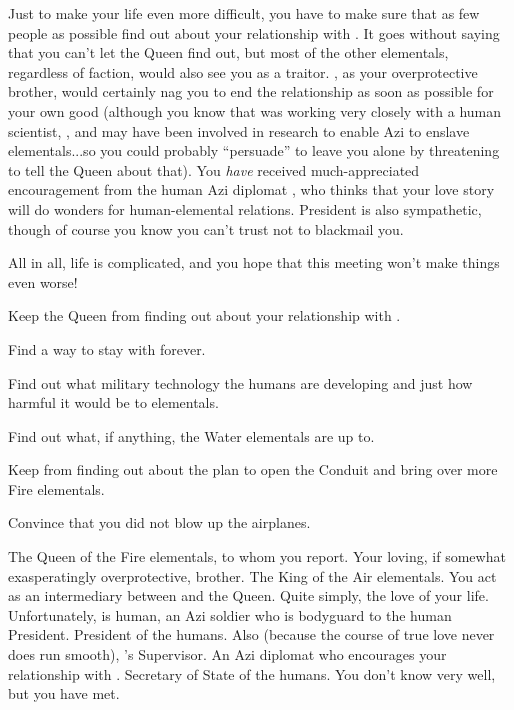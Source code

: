\documentclass[char]{elementals}
\begin{document}
Just to make your life even more difficult, you have to make sure that as few people as possible find out about your relationship with \cRomeo{}.  It goes without saying that you can't let the Queen find out, but most of the other elementals, regardless of faction, would also see you as a traitor.  \cPyro{}, as your overprotective brother, would certainly nag you to end the relationship as soon as possible for your own good (although you know that \cPyro{\they} was working very closely with a human scientist, \cMS{\intro}, and may have been involved in research to enable Azi to enslave elementals...so you could probably ``persuade'' \cPyro{\them} to leave you alone by threatening to tell the Queen about that).  You \emph{have} received much-appreciated encouragement from the human Azi diplomat \cDiplomat{\intro}, who thinks that your love story will do wonders for human-elemental relations.  President \cLeader{} is also sympathetic, though of course you know you can't trust \cLeader{\them} not to blackmail you.

All in all, life is complicated, and you hope that this meeting won't make things even worse!

\begin{itemz}[Goals]
  \item Keep the Queen from finding out about your relationship with \cRomeo{}.
  \item Find a way to stay with \cRomeo{} forever.
  \item Find out what military technology the humans are developing and just how harmful it would be to elementals.
  \item Find out what, if anything, the Water elementals are up to.
  \item Keep \cRomeo{} from finding out about the plan to open the Conduit and bring over more Fire elementals.
  \item Convince \cRomeo{} that you did not blow up the airplanes.
\end{itemz}

\begin{contacts}
  \contact{\cQueen{}} The Queen of the Fire elementals, to whom you report.
  \contact{\cPyro{}} Your loving, if somewhat exasperatingly overprotective, brother.
  \contact{\cKing{}} The King of the Air elementals.  You act as an intermediary between \cKing{\them} and the Queen.
  \contact{\cRomeo{}} Quite simply, the love of your life.  Unfortunately, \cRomeo{\they} is human, an Azi soldier who is bodyguard to the human President.
  \contact{\cLeader{}} President of the humans.  Also (because the course of true love never does run smooth), \cRomeo{}'s Supervisor.
  \contact{\cDiplomat{}} An Azi diplomat who encourages your relationship with \cRomeo{}.
  \contact{\cDema{}} Secretary of State of the humans.  You don't know \cDema{\them} very well, but you have met.
\end{contacts}
\end{document}
